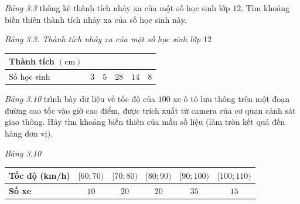 \begin{bt}[Mức độ 1]%
	{\it Bảng 3.3} thống kê thành tích nhảy xa của một số học sinh lớp $12$. Tìm khoảng biến thiên thành tích nhảy xa của số học sinh này.
	\begin{center}
		{\it Bảng 3.3. Thành tích nhảy xa của một số học sinh lớp $12$}\\
		\begin{tabular}{|p{4cm}|p{2cm}|p{2cm}|p{2cm}|p{2cm}|p{2cm}|}
			\hline Thành tích $(\mathrm{cm})$&\centering\arraybackslash {$[150; 180)$} &\centering\arraybackslash {$[180; 210)$} &\centering\arraybackslash {$[210; 240)$} &\centering\arraybackslash {$[240; 270)$} &\centering\arraybackslash {$[270; 300)$} \\
			\hline Số học sinh &\centering\arraybackslash $3$ &\centering\arraybackslash $5$ &\centering\arraybackslash $28$ &\centering\arraybackslash $14$ &\centering\arraybackslash $8$ \\
			\hline
		\end{tabular}
	\end{center}
\end{bt}

\begin{bt}[Mức độ 1]%
	\textit{Bảng 3.10} trình bày dữ liệu về tốc độ của $100$ xe ô tô lưu thông trên một đoạn đường cao tốc vào giờ cao điểm, được trích xuất từ camera của cơ quan cảnh sát giao thông. Hãy tìm khoảng biến thiên của mẫu số liệu (làm tròn kết quả đến hàng đơn vị).
	\begin{center}
		\textit{Bảng 3.10}\\
		\begin{tabular}{|l|c|c|c|c|c|}
			\hline  \textbf{Tốc độ (km/h)} & $[60 ; 70)$& $[70 ; 80)$ & $[80 ; 90)$ & $[90 ; 100)$ & $[100 ; 110)$ \\
			\hline \textbf{Số xe} & $10$ & $20$ & $20$ & $35$ & $15$ \\
			\hline
		\end{tabular}
	\end{center} 
\end{bt}

